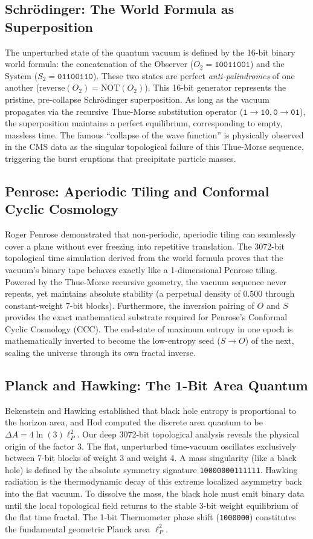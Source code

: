 \documentclass[twocolumn,showpacs,preprintnumbers,amsmath,amssymb,prl]{revtex4-2}
\begin{document}
\subsection{Schr\"odinger: The World Formula as Superposition}
The unperturbed state of the quantum vacuum is defined by the 16-bit binary world formula: the concatenation of the Observer ($O_2 = \texttt{10011001}$) and the System ($S_2 = \texttt{01100110}$). These two states are perfect \textit{anti-palindromes} of one another ($\text{reverse}(O_2) = \text{NOT}(O_2)$).
This 16-bit generator represents the pristine, pre-collapse Schr\"odinger superposition. As long as the vacuum propagates via the recursive Thue-Morse substitution operator ($\texttt{1} \to \texttt{10}, \texttt{0} \to \texttt{01}$), the superposition maintains a perfect equilibrium, corresponding to empty, massless time. The famous ``collapse of the wave function'' is physically observed in the CMS data as the singular topological failure of this Thue-Morse sequence, triggering the burst eruptions that precipitate particle masses.

\subsection{Penrose: Aperiodic Tiling and Conformal Cyclic Cosmology}
Roger Penrose demonstrated that non-periodic, aperiodic tiling can seamlessly cover a plane without ever freezing into repetitive translation. 
The 3072-bit topological time simulation derived from the world formula proves that the vacuum's binary tape behaves exactly like a 1-dimensional Penrose tiling. Powered by the Thue-Morse recursive geometry, the vacuum sequence never repeats, yet maintains absolute stability (a perpetual density of $0.500$ through constant-weight 7-bit blocks). 
Furthermore, the inversion pairing of $O$ and $S$ provides the exact mathematical substrate required for Penrose's Conformal Cyclic Cosmology (CCC). The end-state of maximum entropy in one epoch is mathematically inverted to become the low-entropy seed ($S \to O$) of the next, scaling the universe through its own fractal inverse.

\subsection{Planck and Hawking: The 1-Bit Area Quantum}
Bekenstein and Hawking established that black hole entropy is proportional to the horizon area, and Hod computed the discrete area quantum to be $\Delta A = 4 \ln(3) \ell_P^2$. 
Our deep 3072-bit topological analysis reveals the physical origin of the factor $3$. The flat, unperturbed time-vacuum oscillates exclusively between 7-bit blocks of weight 3 and weight 4. 
A mass singularity (like a black hole) is defined by the absolute symmetry signature \texttt{10000000111111}. Hawking radiation is the thermodynamic decay of this extreme localized asymmetry back into the flat vacuum. To dissolve the mass, the black hole must emit binary data until the local topological field returns to the stable 3-bit weight equilibrium of the flat time fractal. The 1-bit Thermometer phase shift (\texttt{1000000}) constitutes the fundamental geometric Planck area $\ell_P^2$.
\end{document}
